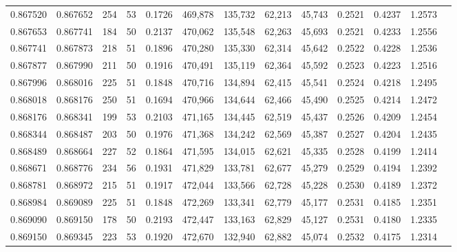 \begin{tabular}{rrrrrrrrrrrrr}
0.867520 & 0.867652 &   254 &  53 &                                     0.1726 & 469,878 & 135,732 &  62,213 &  45,743 & 0.2521 & 0.4237 & 1.2573 \\
0.867653 & 0.867741 &   184 &  50 &                                     0.2137 & 470,062 & 135,548 &  62,263 &  45,693 & 0.2521 & 0.4233 & 1.2556 \\
0.867741 & 0.867873 &   218 &  51 &                                     0.1896 & 470,280 & 135,330 &  62,314 &  45,642 & 0.2522 & 0.4228 & 1.2536 \\
0.867877 & 0.867990 &   211 &  50 &                                     0.1916 & 470,491 & 135,119 &  62,364 &  45,592 & 0.2523 & 0.4223 & 1.2516 \\
0.867996 & 0.868016 &   225 &  51 &                                     0.1848 & 470,716 & 134,894 &  62,415 &  45,541 & 0.2524 & 0.4218 & 1.2495 \\
0.868018 & 0.868176 &   250 &  51 &                                     0.1694 & 470,966 & 134,644 &  62,466 &  45,490 & 0.2525 & 0.4214 & 1.2472 \\
0.868176 & 0.868341 &   199 &  53 &                                     0.2103 & 471,165 & 134,445 &  62,519 &  45,437 & 0.2526 & 0.4209 & 1.2454 \\
0.868344 & 0.868487 &   203 &  50 &                                     0.1976 & 471,368 & 134,242 &  62,569 &  45,387 & 0.2527 & 0.4204 & 1.2435 \\
0.868489 & 0.868664 &   227 &  52 &                                     0.1864 & 471,595 & 134,015 &  62,621 &  45,335 & 0.2528 & 0.4199 & 1.2414 \\
0.868671 & 0.868776 &   234 &  56 &                                     0.1931 & 471,829 & 133,781 &  62,677 &  45,279 & 0.2529 & 0.4194 & 1.2392 \\
0.868781 & 0.868972 &   215 &  51 &                                     0.1917 & 472,044 & 133,566 &  62,728 &  45,228 & 0.2530 & 0.4189 & 1.2372 \\
0.868984 & 0.869089 &   225 &  51 &                                     0.1848 & 472,269 & 133,341 &  62,779 &  45,177 & 0.2531 & 0.4185 & 1.2351 \\
0.869090 & 0.869150 &   178 &  50 &                                     0.2193 & 472,447 & 133,163 &  62,829 &  45,127 & 0.2531 & 0.4180 & 1.2335 \\
0.869150 & 0.869345 &   223 &  53 &                                     0.1920 & 472,670 & 132,940 &  62,882 &  45,074 & 0.2532 & 0.4175 & 1.2314 \\

\end{tabular}
